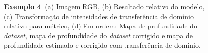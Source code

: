 \begin{figure}[H]
    \centering
    \caption{\textbf{Exemplo 4}. (a) Imagem RGB, (b) Resultado relativo do modelo, (c) Transformação de intensidades de transferência de domínio relativo para métrico, (d) Em ordem: Mapa de profundidade do \textit{dataset}, mapa de profundidade do \textit{dataset} corrigido e mapa de profundidade estimado e corrigido com transferência de domínio.}
    \label{ex1000}
\end{figure}


    